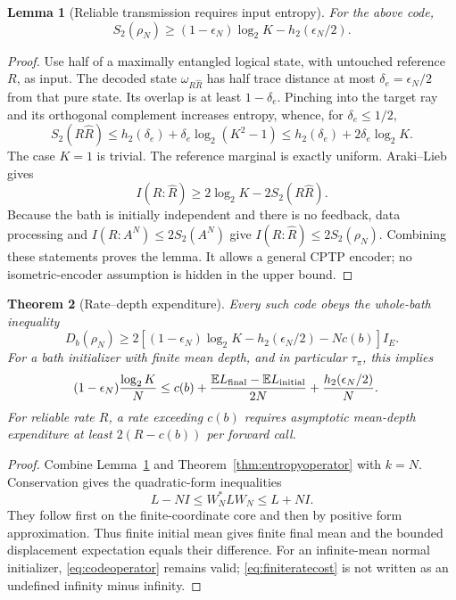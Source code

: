 \documentclass[11pt]{article}
\newtheorem{theorem}{Theorem}[section]
\newtheorem{lemma}[theorem]{Lemma}
\newcommand{\E}{\mathbb E}
\begin{document}
\begin{lemma}[Reliable transmission requires input entropy]
\label{lem:codeentropy}
For the above code,
\[
 S_2(\rho_N)\ge
 (1-\epsilon_N)\log_2K-h_2(\epsilon_N/2).
\]
\end{lemma}
\begin{proof}
Use half of a maximally entangled logical state, with untouched reference
\(R\), as input. The decoded state \(\omega_{R\widehat R}\) has half
trace distance at most \(\delta_e=\epsilon_N/2\) from that pure state.
Its overlap is at least \(1-\delta_e\). Pinching into the target ray
and its orthogonal complement increases entropy, whence, for
\(\delta_e\le1/2\),
\[
 S_2(R\widehat R)\le
 h_2(\delta_e)+\delta_e\log_2(K^2-1)
 \le h_2(\delta_e)+2\delta_e\log_2K.
\]
The case \(K=1\) is trivial. The reference marginal is exactly uniform.
Araki--Lieb gives
\[
 I(R:\widehat R)\ge2\log_2K-2S_2(R\widehat R).
\]
Because the bath is initially independent and there is no feedback,
data processing and \(I(R:A^N)\le2S_2(A^N)\) give
\(I(R:\widehat R)\le2S_2(\rho_N)\).
Combining these statements proves the lemma. It allows a general CPTP
encoder; no isometric-encoder assumption is hidden in the upper bound.
\end{proof}

\begin{theorem}[Rate--depth expenditure]\label{thm:codecost}
Every such code obeys the whole-bath inequality
\begin{equation}\label{eq:codeoperator}
 D_b(\rho_N)\ge
 2[(1-\epsilon_N)\log_2K-h_2(\epsilon_N/2)-Nc(b)]I_E.
\end{equation}
For a bath initializer with finite mean depth, and in particular
\(\tau_\pi\), this implies
\begin{align}
 (1-\epsilon_N)\frac{\log_2K}{N}
 &\le c(b)+\frac{\E L_{\rm final}-\E L_{\rm initial}}{2N}
      +\frac{h_2(\epsilon_N/2)}N. \label{eq:finiteratecost}
\end{align}
For reliable rate \(R\), a rate exceeding \(c(b)\) requires asymptotic
mean-depth expenditure at least \(2(R-c(b))\) per forward call.
\end{theorem}
\begin{proof}
Combine Lemma~\ref{lem:codeentropy} and
Theorem~\ref{thm:entropyoperator} with \(k=N\).
Conservation gives the quadratic-form inequalities
\[
 L-NI\le W_N^*LW_N\le L+NI.
\]
They follow first on the finite-coordinate core and then by positive
form approximation. Thus finite initial mean gives finite final mean
and the bounded displacement expectation equals their difference.
For an infinite-mean normal initializer, \eqref{eq:codeoperator}
remains valid; \eqref{eq:finiteratecost} is not written as an undefined
infinity minus infinity.
\end{proof}
\end{document}
